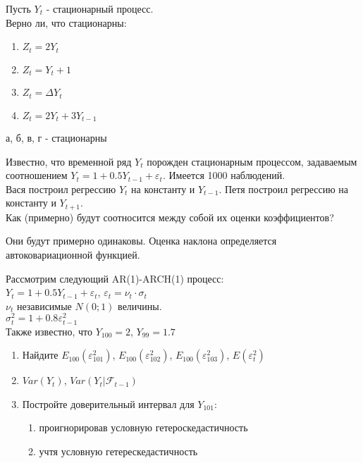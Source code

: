 
\begin{problem}
Пусть $Y_{t}$ - стационарный процесс. \\
Верно ли, что стационарны: 
\begin{enumerate}
\item $Z_{t}=2Y_{t}$ 
\item $Z_{t}=Y_{t}+1$ 
\item $Z_{t}=\Delta Y_{t}$ 
\item $Z_{t}=2Y_{t}+3Y_{t-1}$ 
\end{enumerate}
\end{problem}
\begin{solution}
а, б, в, г - стационарны
\end{solution}





\begin{problem}
Известно, что временной ряд $Y_{t}$ порожден стационарным процессом, задаваемым соотношением $Y_{t}=1+0.5Y_{t-1}+\varepsilon_{t}$. Имеется 1000 наблюдений. \\
Вася построил регрессию $Y_{t}$ на константу и $Y_{t-1}$. Петя построил регрессию на константу и $Y_{t+1}$.\\
Как (примерно) будут соотносится между собой их оценки коэффициентов? 
\end{problem}
\begin{solution}
Они будут примерно одинаковы. Оценка наклона определяется автоковариационной функцией.
\end{solution}





\begin{problem}
Рассмотрим следующий AR(1)-ARCH(1) процесс: \\
$Y_{t}=1+0.5Y_{t-1}+\varepsilon_{t}$, $\varepsilon_{t}=\nu_{t}\cdot \sigma_{t}$ \\
$\nu_{t}$ независимые $N(0;1)$ величины. \\
$\sigma^{2}_{t}=1+0.8\varepsilon^{2}_{t-1}$\\
Также известно, что $Y_{100}=2$, $Y_{99}=1.7$ 
\begin{enumerate}
\item Найдите $E_{100}(\varepsilon^{2}_{101})$, $E_{100}(\varepsilon^{2}_{102})$, $E_{100}(\varepsilon^{2}_{103})$, $E(\varepsilon^{2}_{t})$ 
\item $Var(Y_{t})$, $Var(Y_{t}|\mathcal{F}_{t-1})$ 
\item Постройте доверительный интервал для $Y_{101}$: 
\begin{enumerate}
\item проигнорировав условную гетероскедастичность 
\item учтя условную гетерескедастичность
\end{enumerate}
\end{enumerate}
\end{problem}
\begin{solution}
\end{solution}

